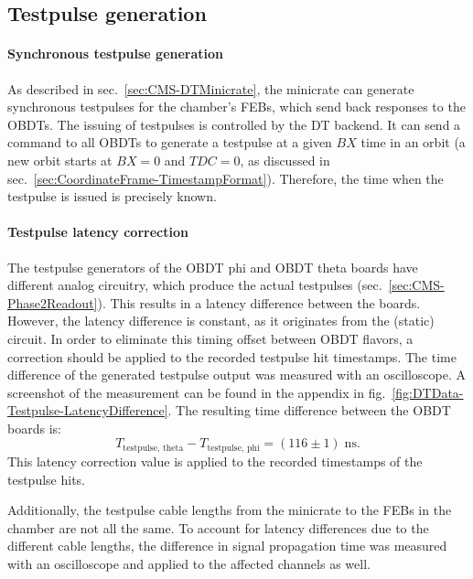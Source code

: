 \subsection{Testpulse generation}
\label{sec:DTData-Testpulse-Generation}
\paragraph{Synchronous testpulse generation}
As described in sec.\ \ref{sec:CMS-DTMinicrate}, the minicrate can generate synchronous testpulses for the chamber's \acp{FEB}, which send back responses to the \acp{OBDT}. The issuing of testpulses is controlled by the \ac{DT} backend. It can send a command to all \acp{OBDT} to generate a testpulse at a given $BX$ time in an orbit (a new orbit starts at $BX=0$ and $TDC=0$, as discussed in sec.\ \ref{sec:CoordinateFrame-TimestampFormat}). Therefore, the time when the testpulse is issued is precisely known.
\paragraph{Testpulse latency correction}
The testpulse generators of the \ac{OBDT} phi and \ac{OBDT} theta boards have different analog circuitry, which produce the actual testpulses (sec.\ \ref{sec:CMS-Phase2Readout}). This results in a latency difference between the boards. However, the latency difference is constant, as it originates from the (static) circuit. In order to eliminate this timing offset between \ac{OBDT} flavors, a correction should be applied to the recorded testpulse hit timestamps. The time difference of the generated testpulse output was measured with an oscilloscope. A screenshot of the measurement can be found in the appendix in fig.\ \ref{fig:DTData-Testpulse-LatencyDifference}. The resulting time difference between the \ac{OBDT} boards is:
\begin{equation}
    T_\text{testpulse, theta} - T_\text{testpulse, phi} = (116 \pm 1)\;\si{\nano\second}.
    \label{eq:DTData-TestpulseLatency}
\end{equation}
This latency correction value is applied to the recorded timestamps of the testpulse hits.
\par Additionally, the testpulse cable lengths from the minicrate to the \acp{FEB} in the chamber are not all the same. To account for latency differences due to the different cable lengths, the difference in signal propagation time was measured with an oscilloscope and applied to the affected channels as well.

